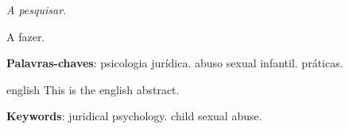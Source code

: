 \documentclass[12pt,oneside,a4paper,english,french,spanish]{abntex2}
\begin{document}
\begin{epigrafe}
    \vspace*{\fill}
	\begin{flushright}
		\textit{A pesquisar.}
	\end{flushright}
\end{epigrafe}


\begin{resumo}
 A fazer.

 \vspace{\onelineskip}
    
 \noindent
 \textbf{Palavras-chaves}: psicologia jurídica. abuso sexual infantil. práticas.
\end{resumo}

\begin{resumo}[Abstract]
  \begin{otherlanguage*}{english}
    This is the english abstract.

    \vspace{\onelineskip}
 
    \noindent 
    \textbf{Keywords}: juridical psychology. child sexual abuse.
  \end{otherlanguage*}
\end{resumo}

\renewcommand{\ABNTEXchapterfont}{\fontfamily{cmr}\fontseries{b}\selectfont}

\tableofcontents*
\cleardoublepage

\mainmatter




\end{document}
